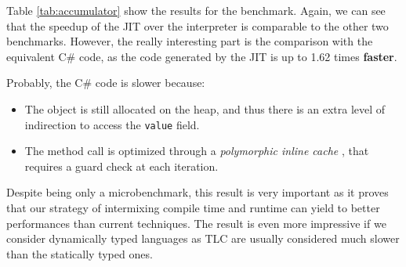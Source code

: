 Table \ref{tab:accumulator} show the results for the benchmark.  Again, we can
see that the speedup of the JIT over the interpreter is comparable to the
other two benchmarks.  However, the really interesting part is the comparison
with the equivalent C\# code, as the code generated by the JIT is up to 1.62 times
\textbf{faster}.

Probably, the C\# code is slower because:

\begin{itemize}
\item The object is still allocated on the heap, and thus there is an extra
  level of indirection to access the \lstinline{value} field.
\item The method call is optimized through a \emph{polymorphic inline cache}
  \cite{hoelzle_optimizing_1991}, that requires a guard check at each iteration.
\end{itemize}


Despite being only a microbenchmark, this result is very important as it proves
that our strategy of intermixing compile time and runtime can yield to better
performances than current techniques.  The result is even more impressive if
we consider dynamically typed languages as TLC are usually considered much
slower than the statically typed ones.
